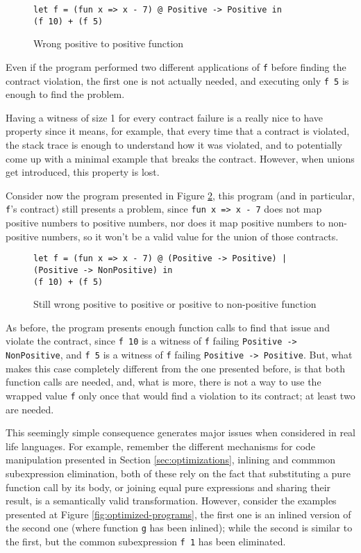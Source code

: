 \documentclass[sigplan,10pt,review,anonymous]{acmart}
\newcommand{\nickel}[1]{\lstinline[language=nickel]{#1}}
\begin{document}
\begin{figure}[h]
\begin{lstlisting}[language=nickel]
let f = (fun x => x - 7) @ Positive -> Positive in
(f 10) + (f 5)
\end{lstlisting}
\caption{Wrong positive to positive function}
\label{fig:pos-to-pos}
\end{figure}

Even if the program performed two different applications of \nickel{f}
before finding the contract violation, the first one is not actually
needed, and executing only \nickel{f 5} is enough to find the problem.

Having a witness of size 1 for every contract failure is a really nice to have property
since it means, for example, that every time that a contract is violated,
the stack trace is enough to understand how it was violated, and to potentially
come up with a minimal example that breaks the contract.
However, when unions get introduced, this property is lost.

Consider now the program presented in Figure \ref{fig:wrong-union-function},
this program (and in particular, \nickel{f}'s contract) still presents a problem,
since \nickel{fun x => x - 7} does not map positive numbers to positive numbers,
nor does it map positive numbers to non-positive numbers, so it won't be a valid
value for the union of those contracts.


\begin{figure}[h]
\begin{lstlisting}[language=nickel]
let f = (fun x => x - 7) @ (Positive -> Positive) | (Positive -> NonPositive) in
(f 10) + (f 5)
\end{lstlisting}
\caption{Still wrong positive to positive or positive to non-positive function}
\label{fig:wrong-union-function}
\end{figure}

As before, the program presents enough function calls to find that issue
and violate the contract,
since \nickel{f 10} is a witness of \nickel{f} failing \nickel{Positive -> NonPositive},
and \nickel{f 5} is a witness of \nickel{f} failing \nickel{Positive -> Positive}.
But, what makes this case completely different from the one presented before, is that
both function calls are needed, and, what is more, there is not a way to
use the wrapped value \nickel{f} only once that would find a violation to its contract;
at least two are needed.

This seemingly simple consequence generates major issues when considered in real
life languages.
For example, remember the different mechanisms for code manipulation presented
in Section \ref{sec:optimizations}, inlining and commmon subexpression elimination,
both of these rely on the fact that substituting a pure function call by its body,
or joining equal pure expressions and sharing their result, is a semantically valid
transformation.
However, consider the examples presented at Figure \ref{fig:optimized-programs},
the first one is an inlined version of the second one (where function
\nickel{g} has been inlined); while the second is similar to the first, but
the common subexpression \nickel{f 1} has been eliminated.
\end{document}
